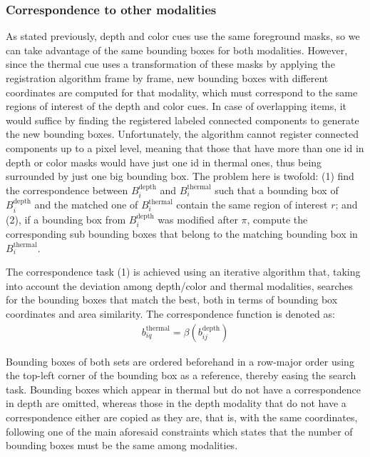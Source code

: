 \documentclass[10pt,twocolumn,letterpaper]{article}
\begin{document}
\subsubsection{Correspondence to other modalities} 
\label{sssec:correspondence}
As stated previously, depth and color cues use the same foreground masks, so we can take advantage of the same bounding boxes for both modalities. However, since the thermal cue uses a transformation of these masks by applying the registration algorithm frame by frame, new bounding boxes with different coordinates are computed for that modality, which must correspond to the same regions of interest of the depth and color cues. In case of overlapping items, it would suffice by finding the registered labeled connected components to generate the new bounding boxes. Unfortunately, the algorithm cannot register connected components up to a pixel level, meaning that those that have more than one id in depth or color masks would have just one id in thermal ones, thus being surrounded by just one big bounding box. The problem here is twofold: (1) find the correspondence between $B^\mathrm{depth}_i$ and $B^\mathrm{thermal}_i$ such that a bounding box of $B^\mathrm{depth}_i$ and the matched one of $B^\mathrm{thermal}_i$ contain the same region of interest $r$; and (2), if a bounding box from $B^\mathrm{depth}_i$ was modified after $\pi$, compute the corresponding sub bounding boxes that belong to the matching bounding box in $B^\mathrm{thermal}_i$.   

The correspondence task (1) is achieved using an iterative algorithm that, taking into account the deviation among depth/color and thermal modalities, searches for the bounding boxes that match the best, both in terms of bounding box coordinates and area similarity. The correspondence function is denoted as:
\begin{gather}
b^\mathrm{thermal}_{iq} =  \beta(b^\mathrm{depth}_{ij})
\end{gather}
 
Bounding boxes of both sets are ordered beforehand in a row-major order using the top-left corner of the bounding box as a reference, thereby easing the search task. Bounding boxes which appear in thermal but do not have a correspondence in depth are omitted, whereas those in the depth modality that do not have a correspondence either are copied as they are, that is, with the same coordinates, following one of the main aforesaid constraints which states that the number of bounding boxes must be the same among modalities.
\end{document}
